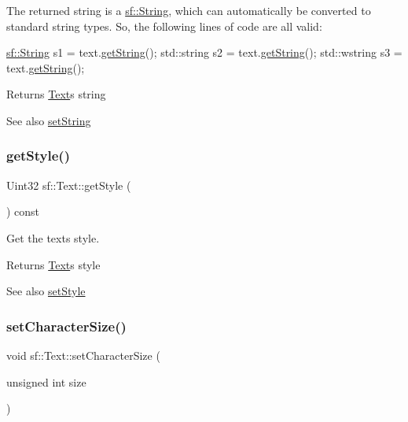 The returned string is a \hyperlink{classsf_1_1_string}{sf\+::\+String}, which can automatically be converted to standard string types. So, the following lines of code are all valid\+: 
\begin{DoxyCode}
\hyperlink{classsf_1_1_string}{sf::String}   s1 = text.\hyperlink{classsf_1_1_text_a084c275eb4bca835696af5f8f9c80ab3}{getString}();
std::string  s2 = text.\hyperlink{classsf_1_1_text_a084c275eb4bca835696af5f8f9c80ab3}{getString}();
std::wstring s3 = text.\hyperlink{classsf_1_1_text_a084c275eb4bca835696af5f8f9c80ab3}{getString}();
\end{DoxyCode}


\begin{DoxyReturn}{Returns}
\hyperlink{classsf_1_1_text}{Text}\textquotesingle{}s string
\end{DoxyReturn}
\begin{DoxySeeAlso}{See also}
\hyperlink{classsf_1_1_text_a7d3b3359f286fd9503d1ced25b7b6c33}{set\+String} 
\end{DoxySeeAlso}
\mbox{\label{classsf_1_1_text_a0da79b0c057f4bb51592465a205c35d7}} 
\subsubsection{\texorpdfstring{get\+Style()}{getStyle()}}
{\footnotesize\ttfamily Uint32 sf\+::\+Text\+::get\+Style (\begin{DoxyParamCaption}{ }\end{DoxyParamCaption}) const}



Get the text\textquotesingle{}s style. 

\begin{DoxyReturn}{Returns}
\hyperlink{classsf_1_1_text}{Text}\textquotesingle{}s style
\end{DoxyReturn}
\begin{DoxySeeAlso}{See also}
\hyperlink{classsf_1_1_text_ad791702bc2d1b6590a1719aa60635edf}{set\+Style} 
\end{DoxySeeAlso}
\mbox{\label{classsf_1_1_text_ae96f835fc1bff858f8a23c5b01eaaf7e}} 
\subsubsection{\texorpdfstring{set\+Character\+Size()}{setCharacterSize()}}
{\footnotesize\ttfamily void sf\+::\+Text\+::set\+Character\+Size (\begin{DoxyParamCaption}\item[{unsigned int}]{size }\end{DoxyParamCaption})}



